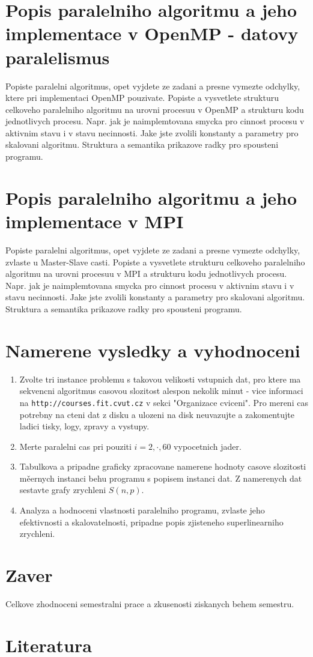 \documentclass[epsf,epic,eepic,eepicemu]{article}\oddsidemargin=-5mm
\begin{document}
\section{Popis paralelniho algoritmu a jeho implementace v OpenMP - datovy paralelismus}

Popiste paralelni algoritmus, opet vyjdete ze zadani a presne vymezte
odchylky, ktere pri implementaci OpenMP pouzivate.
Popiste a vysvetlete strukturu celkoveho
paralelniho algoritmu na urovni procesuu v OpenMP a strukturu kodu
jednotlivych procesu. Napr. jak je naimplemtovana smycka pro cinnost
procesu v aktivnim stavu i v stavu necinnosti. Jake jste zvolili
konstanty a parametry pro skalovani algoritmu. Struktura a semantika
prikazove radky pro spousteni programu.

\section{Popis paralelniho algoritmu a jeho implementace v MPI}

Popiste paralelni algoritmus, opet vyjdete ze zadani a presne vymezte
odchylky, zvlaste u Master-Slave casti. Popiste a vysvetlete strukturu celkoveho
paralelniho algoritmu na urovni procesuu v MPI a strukturu kodu
jednotlivych procesu. Napr. jak je naimplemtovana smycka pro cinnost
procesu v aktivnim stavu i v stavu necinnosti. Jake jste zvolili
konstanty a parametry pro skalovani algoritmu. Struktura a semantika
prikazove radky pro spousteni programu.

\section{Namerene vysledky a vyhodnoceni}

\begin{enumerate}
\item Zvolte tri instance problemu s takovou velikosti vstupnich dat, pro ktere ma sekvencni 
algoritmus casovou slozitost alespon nekolik minut - vice informaci na {\tt http://courses.fit.cvut.cz} v sekci "Organizace cviceni".
Pro mereni cas potrebny na cteni dat z disku a ulozeni na disk neuvazujte a zakomentujte
ladici tisky, logy, zpravy a vystupy.
\item Merte paralelni cas pri pouziti $i=2,\cdot,60$ vypocetnich jader.
\item Tabulkova a pripadne graficky zpracovane namerene hodnoty casove slozitosti měernych instanci behu programu s popisem instanci dat. Z namerenych dat sestavte grafy zrychleni $S(n,p)$. 
\item Analyza a hodnoceni vlastnosti paralelniho programu, zvlaste jeho efektivnosti a skalovatelnosti, pripadne popis zjisteneho superlinearniho zrychleni.

\end{enumerate}

\section{Zaver}

Celkove zhodnoceni semestralni prace a zkusenosti ziskanych behem semestru.

\section{Literatura}



\end{document}
